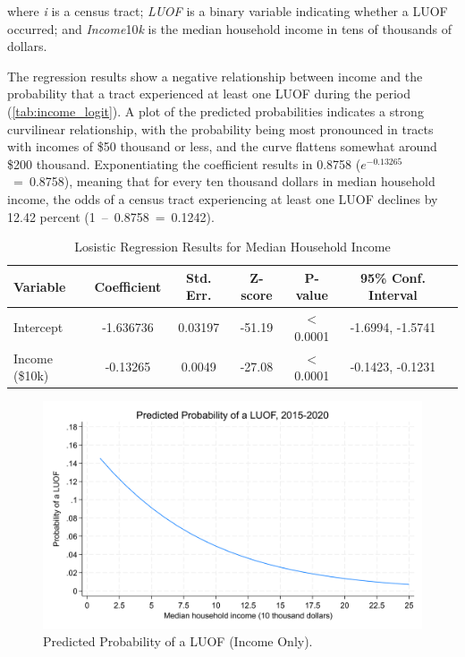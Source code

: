 \documentclass[12pt]{article}
\begin{document}
\noindent{}where \textit{i} is a census tract; \textit{LUOF} is a binary variable indicating whether a LUOF occurred; and \textit{Income}10\textit{k} is the median household income in tens of thousands of dollars.

The regression results show a negative relationship between income and the probability that a tract experienced at least one LUOF during the period (\autoref{tab:income_logit}). A plot of the predicted probabilities indicates a strong curvilinear relationship, with the probability being most pronounced in tracts with incomes of \$50 thousand or less, and the curve flattens somewhat around \$200 thousand. Exponentiating the coefficient results in 0.8758 ($e^{-0.13265}$~=~0.8758), meaning that for every ten thousand dollars in median household income, the odds of a census tract experiencing at least one LUOF declines by 12.42 percent (1~--~0.8758~=~0.1242).

\begin{table}[h!]
\centering
\begin{tabular}{lcccccc}
\toprule
Variable & Coefficient & Std. Err. & Z-score & P-value & 95\% Conf. Interval \\
\midrule
Intercept & -1.636736 & 0.03197 & -51.19 & $<$0.0001 & -1.6994, -1.5741 \\
Income (\$10k) & -0.13265 & 0.0049 & -27.08 & $<$0.0001 & -0.1423, -0.1231 \\
\bottomrule
\end{tabular}
\caption{Losistic Regression Results for Median Household Income}
\label{tab:income_logit}
\end{table}

\begin{figure}[H]
  \centering %
  \includegraphics[width=\linewidth]{images/LUOF_logit_income_only}
  \captionsetup{justification=centering, singlelinecheck=false, margin=2cm}
  \caption[Predicted Probability of a LUOF (Income Only)]{Predicted Probability of a LUOF (Income Only).}
  \label{fig:logit_income_plot}
\end{figure}
\end{document}
